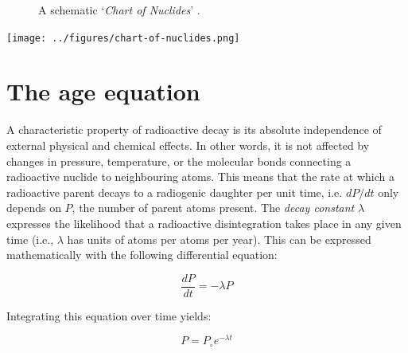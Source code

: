 \ifpdf
\ifuclnotes
\begin{figure}[!ht]
  \centering
  \def\svgwidth{.7\textwidth}
  
  \caption{A schematic `\emph{Chart of Nuclides}' \citep[modified
      from][]{allegre2008}.}
  \label{fig:chart-of-nuclides}
\end{figure}
\else %
\noindent\begin{minipage}[t]{.6\textwidth}
\strut\vspace*{-\baselineskip}\newline
\def\svgwidth{\textwidth}

\end{minipage}
\begin{minipage}[t]{.4\textwidth}
  \label{fig:chart-of-nuclides}
\end{minipage}
\fi %
\else
\texttt{[image: ../figures/chart-of-nuclides.png]}
\fi

\section{The age equation}

A characteristic property of radioactive decay is its absolute
independence of external physical and chemical effects. In other
words, it is not affected by changes in pressure, temperature, or the
molecular bonds connecting a radioactive nuclide to neighbouring
atoms. This means that the rate at which a radioactive parent decays
to a radiogenic daughter per unit time, i.e. $dP/dt$ only depends on
$P$, the number of parent atoms present. The \emph{decay constant}
$\lambda$ expresses the likelihood that a radioactive disintegration
takes place in any given time (i.e., $\lambda$ has units of atoms per
atoms per year). This can be expressed mathematically with the
following differential equation:

\begin{equation}
\frac{dP}{dt} = -\lambda P
\label{eq:dPdt}
\end{equation}

Integrating this equation over time yields:

\begin{equation}
P = P_\circ e^{-\lambda t}
\label{eq:P}
\end{equation}

